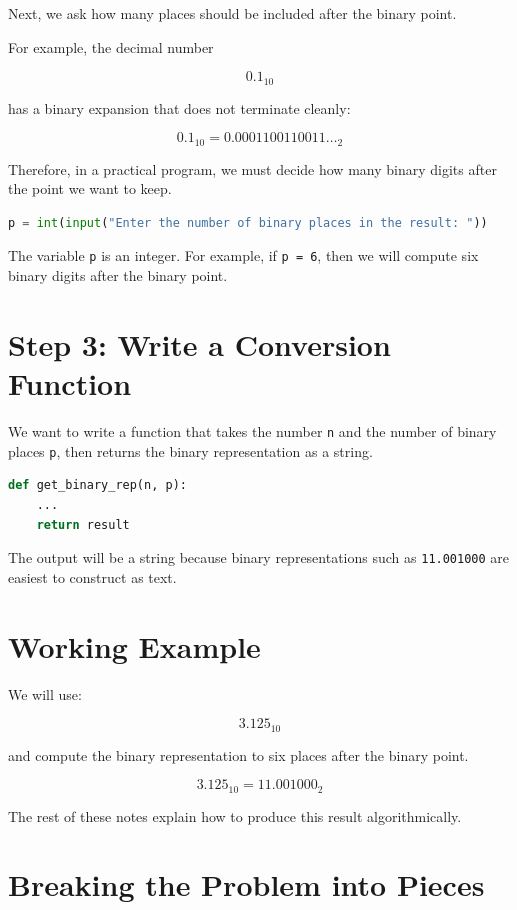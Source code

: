 \documentclass[11pt]{article}
\begin{document}
Next, we ask how many places should be included after the binary point.

For example, the decimal number

\[
0.1_{10}
\]

has a binary expansion that does not terminate cleanly:

\[
0.1_{10} = 0.0001100110011\ldots_2
\]

Therefore, in a practical program, we must decide how many binary digits after the point we want to keep.

\begin{lstlisting}[language=Python]
p = int(input("Enter the number of binary places in the result: "))
\end{lstlisting}

The variable \texttt{p} is an integer. For example, if \texttt{p = 6}, then we will compute six binary digits after the binary point.

\section{Step 3: Write a Conversion Function}

We want to write a function that takes the number \texttt{n} and the number of binary places \texttt{p}, then returns the binary representation as a string.

\begin{lstlisting}[language=Python]
def get_binary_rep(n, p):
    ...
    return result
\end{lstlisting}

The output will be a string because binary representations such as \texttt{11.001000} are easiest to construct as text.

\section{Working Example}

We will use:

\[
3.125_{10}
\]

and compute the binary representation to six places after the binary point.

\[
3.125_{10} = 11.001000_2
\]

The rest of these notes explain how to produce this result algorithmically.

\section{Breaking the Problem into Pieces}
\end{document}
